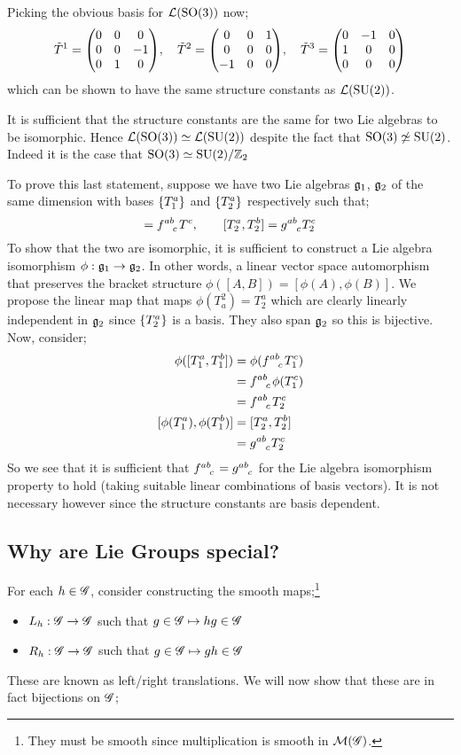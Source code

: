 Picking the obvious basis for $\lie{\SO{3}}$ now;
\begin{equation*}
\tilde{T}^1 = \thrbythr{0 & 0 & 0}{0 & 0 & -1}{0 & 1 & 0}, \quad \tilde{T}^2 = \thrbythr{0 & 0 & 1}{0 & 0 & 0}{-1 & 0 & 0}, \quad \tilde{T}^3 = \thrbythr{0 & -1 & 0}{1 & 0 & 0}{0 & 0 & 0}
\end{equation*}
which can be shown to have the same structure constants as $\lie{\SU{2}}$.
\begin{definitionbox}
It is sufficient that the structure constants are the same for two Lie algebras to be isomorphic. Hence $\lie{\SO{3}} \simeq \lie{\SU{2}}$ despite the fact that $\SO{3} \not\simeq \SU{2}$. Indeed it is the case that $\SO{3} \simeq \SU{2} / \ZZ_2$
\end{definitionbox}
To prove this last statement, suppose we have two Lie algebras $\mathfrak{g}_1$, $\mathfrak{g}_2$ of the same dimension with bases $\set{T^a_1}$ and $\set{T^a_2}$ respectively such that;
\begin{equation*}
[T_1^a, T_1^b] = f\indices{^{ab}_{c}}T^c, \qquad [T^a_2, T^b_2] = g\indices{^{ab}_{c}}T^c_2
\end{equation*}
To show that the two are isomorphic, it is sufficient to construct a Lie algebra isomorphism $\phi : \mathfrak{g}_1 \rightarrow \mathfrak{g}_2$. In other words, a linear vector space automorphism that preserves the bracket structure $\phi([A, B]) = [\phi(A), \phi(B)]$. We propose the linear map that maps $\phi(T_a^2) = T^a_2$ which are clearly linearly independent in $\mathfrak{g}_2$ since $\set{T^a_2}$ is a basis. They also span $\mathfrak{g}_2$ so this is bijective. Now, consider;
\begin{align*}
\phi([T^a_1, T^b_1]) &= \phi(f\indices{^{ab}_{c}}T^c_1) \\
&= f\indices{^{ab}_{c}}\phi(T^c_1) \\
&= f\indices{^{ab}_{c}}T^c_2 \\
[\phi(T^a_1), \phi(T^b_1)] &= [T^a_2, T^b_2] \\
&= g\indices{^{ab}_{c}}T^c_2
\end{align*}
So we see that it is sufficient that $f\indices{^{ab}_{c}} = g\indices{^{ab}_{c}}$ for the Lie algebra isomorphism property to hold (taking suitable linear combinations of basis vectors). It is not necessary however since the structure constants are basis dependent. 
\subsection{Why are Lie Groups special?}
For each $h \in \mathscr{G}$, consider constructing the smooth maps;\footnote{They must be smooth since multiplication is smooth in $\mathcal{M}(\mathscr{G})$.}
\begin{itemize}
\item $L_h : \mathscr{G} \rightarrow \mathscr{G}$ such that $g \in \mathscr{G} \mapsto hg \in \mathscr{G}$
\item $R_h : \mathscr{G} \rightarrow \mathscr{G}$ such that $g \in \mathscr{G} \mapsto gh \in \mathscr{G}$
\end{itemize}
These are known as left/right translations. We will now show that these are in fact bijections on $\mathscr{G}$;

